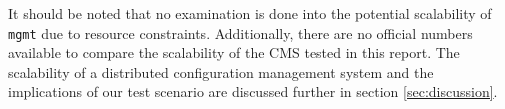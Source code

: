 \noindent
It should be noted that no examination is done into the potential scalability of \texttt{mgmt} due to resource constraints. Additionally, there are no official numbers available to compare the scalability of the CMS tested in this report. The scalability of a distributed configuration management system and the implications of our test scenario are discussed further in section \ref{sec:discussion}.  
